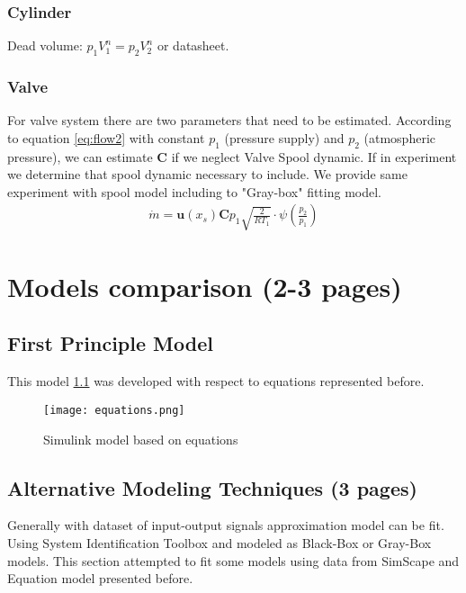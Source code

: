 \subsection{Cylinder}
Dead volume: $p_1 V_1^n = p_2 V_2^n$ or datasheet.

\subsection{Valve}
For valve system there are two parameters that need to be estimated.
According to equation \ref{eq:flow2} with constant $p_1$ (pressure supply) and $p_2$
(atmospheric pressure), we can estimate $\boldsymbol{C}$ if we neglect Valve Spool dynamic.
If in experiment we determine that spool dynamic necessary to include. We
provide same experiment with spool model including to "Gray-box" fitting
model.
\begin{align}
    \dot{m} = \boldsymbol{u}(x_s) \boldsymbol{C}  p_1 \sqrt{\frac{2}{RT_1}}
    \cdot \psi\left(\frac{p_2}{p_1}\right)
    \label{eq:flow2}
\end{align}



\chapter{Models comparison (2-3 pages)}


\section{First Principle Model}
This model \ref{fig:model_equations} was developed with respect to equations
represented before.

\begin{figure}[h!]
    \centering
    \texttt{[image: equations.png]}
    \caption{Simulink model based on equations}
    \label{fig:model_equations}
\end{figure}

\section{Alternative Modeling Techniques (3 pages)}
Generally with dataset of input-output signals approximation model can be
fit. Using System Identification Toolbox and modeled as Black-Box or
Gray-Box models. This section attempted to fit some models using data from
SimScape and Equation model presented before.

